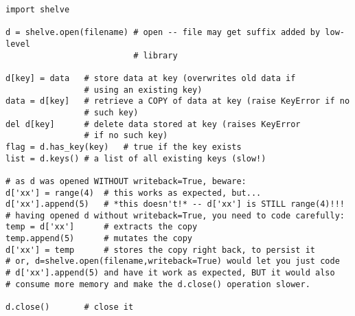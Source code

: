 \begin{verbatim}
import shelve

d = shelve.open(filename) # open -- file may get suffix added by low-level
                          # library

d[key] = data   # store data at key (overwrites old data if
                # using an existing key)
data = d[key]   # retrieve a COPY of data at key (raise KeyError if no
                # such key)
del d[key]      # delete data stored at key (raises KeyError
                # if no such key)
flag = d.has_key(key)   # true if the key exists
list = d.keys() # a list of all existing keys (slow!)

# as d was opened WITHOUT writeback=True, beware:
d['xx'] = range(4)  # this works as expected, but...
d['xx'].append(5)   # *this doesn't!* -- d['xx'] is STILL range(4)!!!
# having opened d without writeback=True, you need to code carefully:
temp = d['xx']      # extracts the copy
temp.append(5)      # mutates the copy
d['xx'] = temp      # stores the copy right back, to persist it
# or, d=shelve.open(filename,writeback=True) would let you just code
# d['xx'].append(5) and have it work as expected, BUT it would also
# consume more memory and make the d.close() operation slower.

d.close()       # close it
\end{verbatim}

\begin{seealso}
\end{seealso}

